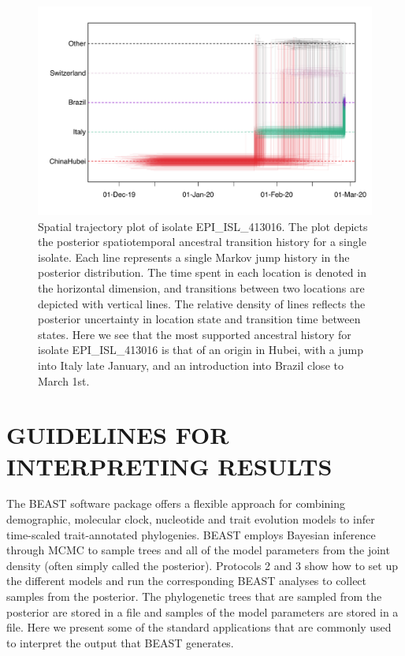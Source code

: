 \documentclass{article}
\newcommand{\code}[1]{
{\upshape\ttfamily{#1}}}
\begin{document}
\begin{figure}[!ht]
    \centering
    \includegraphics[width=1.0\textwidth]{figs/travel_trajectory.pdf}
    \caption{Spatial trajectory plot of isolate EPI\_ISL\_413016. The plot depicts the posterior spatiotemporal ancestral transition history for a single isolate. Each line represents a single Markov jump history in the posterior distribution. The time spent in each location is denoted in the horizontal dimension, and transitions between two locations are depicted with vertical lines. The relative density of lines reflects the posterior uncertainty in location state and transition time between states. Here we see that the most supported ancestral history for isolate EPI\_ISL\_413016 is that of an origin in Hubei, with a jump into Italy late January, and an introduction into Brazil close to March 1st.}
    \label{fig:trajectory}
\end{figure}


\section*{GUIDELINES FOR INTERPRETING RESULTS}

The BEAST software package offers a flexible approach for combining demographic, molecular clock, nucleotide and trait evolution models to infer time-scaled trait-annotated phylogenies.
BEAST employs Bayesian inference through MCMC to sample trees and all of the model parameters from the joint density (often simply called the posterior).
Protocols 2 and 3 show how to set up the different models and run the corresponding BEAST analyses to collect samples from the posterior.
The phylogenetic trees that are sampled from the posterior are stored in a\code{.trees} file and samples of the model parameters are stored in a\code{.log} file.
Here we present some of the standard applications that are commonly used to interpret the output that BEAST generates.
\end{document}
